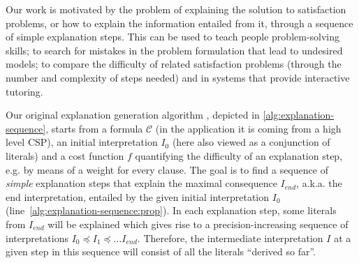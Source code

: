 \documentclass[twoside,11pt]{article}
\newcommand\m[1]{\mathcal{#1}}
\newcommand\comment[1]{\marginpar{\tiny #1}}
\renewcommand\comment[1]{#1}
\newcommand{\emilio}[1]{{\comment{\color{red}Emilio: #1}}}
\newcommand{\bart}[1]{{\comment{\color{OliveGreen}Bart: #1}}}
\newcommand\Iend{\ensuremath{I_\mathit{end} }\xspace}
\newcommand\formulac{\ensuremath{\m{C} }\xspace}
\begin{document}
Our work is motivated by the problem of explaining the solution to satisfaction problems, or how to explain the information entailed from it,
through a sequence of simple explanation steps. This can be used to teach people problem-solving skills; to search for mistakes in the problem formulation that lead to undesired models; to compare the difficulty of related satisfaction problems (through the number and complexity of steps needed) and in systems that provide interactive tutoring.  

Our original explanation generation algorithm \cite{ecai/BogaertsGCG20}, depicted in \cref{alg:explanation-sequence}, starts from a formula $\formulac$ (in the application it is coming from a high level CSP), an initial interpretation $I_0$ (here also viewed as a conjunction of literals) and a cost function $f$ quantifying the difficulty of an explanation step, e.g. by means of a weight for every clause. 
The goal is to find a sequence of \emph{simple} explanation steps that explain the maximal consequence \Iend, a.k.a. the end interpretation, entailed by the given initial interpretation $I_0$ (line~\ref{alg:explanation-sequence:prop}).
In each explanation step, some literals from \Iend will be explained which gives rise to a precision-increasing sequence of interpretations $I_0 \preceq I_1 \preceq \dots I_{end}$.
Therefore, the intermediate interpretation $I$ at a given step in this sequence will consist of all the literals ``derived so far''. 
\end{document}
